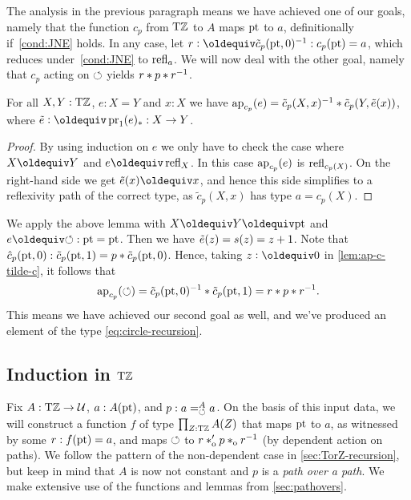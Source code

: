 \documentclass[a4paper,12pt]{amsart}
\begin{document}
The analysis in the previous paragraph
means we have achieved one of our goals,
namely that the function $c_p$ from ${\mathrm{T}\mathbb{Z}}$ to $A$
maps ${\mathord{\mathrm{pt}}}$ to $a$, definitionally if~\cref{cond:JNE} holds.
In any case, let $r \defeq \tilde c_p(\pt,0)^{-1} : c_p(\pt) = a$,
which reduces under~\cref{cond:JNE} to $\mathop{{\mathrm{refl}}_{a}}$.
We will now deal with the other goal,
namely that $c_p$ acting on ${\circlearrowleft}$ yields $r * p * r^{-1}$.

\begin{lemma}\label{lem:ap-c-tilde-c}
For all $X,Y:{\mathrm{T}\mathbb{Z}}$, $e: X=Y$ and $x:X$ we have
$\mathop{{\mathrm{ap}}_{c_p}}(e) = \tilde c_p(X,x)^{-1}* \tilde c_p(Y,\tilde {e}(x))$,
where $\ptoe{e}\defeq \pr_1(e)_* : X\to Y$.
\end{lemma}
\begin{proof}
By using induction on $e$ we only have to check the case where
$X\jdeq Y$ and $e\jdeq\refl{X}$. In this case $\mathop{{\mathrm{ap}}_{c_p}}(e)$ is
$\mathop{{\mathrm{refl}}_{c_p(X)}}$. On the right-hand side we get $\ptoe{e}(x)\jdeq x$,
and hence this side simplifies to a reflexivity path of
the correct type, as $\tilde c_p(X,x)$ has type $a=c_p(X)$.
\end{proof}

We apply the above lemma with $X\jdeq Y\jdeq \pt$ and $e\jdeq{\Zloop}: \pt=\pt$.
Then we have $\tilde {e}(z)=s(z)=z+1$.
Note that $\hat c_p({\mathord{\mathrm{pt}}},0) : \tilde c_p({\mathord{\mathrm{pt}}},1) = p * \tilde c_p({\mathord{\mathrm{pt}}},0)$.
Hence, taking $z\defeq 0$ in \cref{lem:ap-c-tilde-c}, it follows that
\[
  \mathop{{\mathrm{ap}}_{c_p}}({\circlearrowleft}) = \tilde c_p({\mathord{\mathrm{pt}}},0)^{-1} * \tilde c_p({\mathord{\mathrm{pt}}},1)
  = r * p * r^{-1}.
\]
This means we have achieved our second goal as well,
and we've produced an element of the type \eqref{eq:circle-recursion}.

\subsection{Induction in ${\mathrm{T}\mathbb{Z}}$}\label{sec:TorZ-induction}

Fix $A:{\mathrm{T}\mathbb{Z}}\to\mathcal{U}$, $a:A({\mathord{\mathrm{pt}}})$, and $p: a=^A_{{\circlearrowleft}} a$.
On the basis of this input data, we will construct a function $f$ of
type $\prod_{Z:{\mathrm{T}\mathbb{Z}}} A(Z)$ that maps ${\mathord{\mathrm{pt}}}$ to $a$,
as witnessed by some $r : f({\mathord{\mathrm{pt}}}) = a$,
and maps ${\circlearrowleft}$ to $r *_{\mathrm{o}}' p *_{\mathrm{o}} r^{-1}$ (by dependent action on paths).
We follow the pattern of the non-dependent case
in \cref{sec:TorZ-recursion}, but keep in mind that
$A$ is now not constant and $p$ is a \emph{path over a path}.
{We make extensive use of the functions and lemmas from \cref{sec:pathovers}.}
\end{document}
